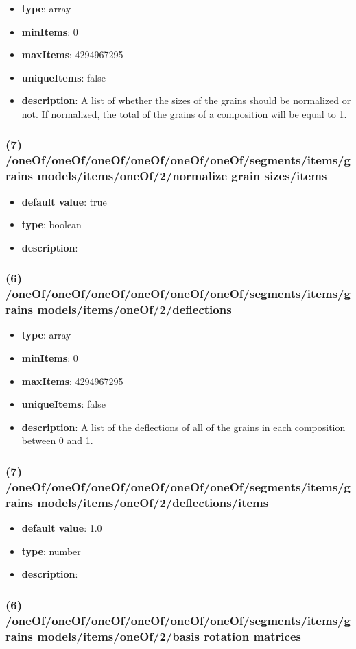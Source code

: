 \begin{itemize}[leftmargin=6em]\item {\bf type}: array
\item {\bf minItems}: 0
\item {\bf maxItems}: 4294967295
\item {\bf uniqueItems}: false
\item {\bf description}: A list of whether the sizes of the grains should be normalized or not. If normalized, the total of the grains of a composition will be equal to 1.
\end{itemize}\subsubsection{(7) /oneOf/oneOf/oneOf/oneOf/oneOf/oneOf/segments/items/grains models/items/oneOf/2/normalize grain sizes/items}
\begin{itemize}[leftmargin=7em]\item {\bf default value}: true
\item {\bf type}: boolean
\item {\bf description}: 
\end{itemize}\subsubsection{(6) /oneOf/oneOf/oneOf/oneOf/oneOf/oneOf/segments/items/grains models/items/oneOf/2/deflections}
\begin{itemize}[leftmargin=6em]\item {\bf type}: array
\item {\bf minItems}: 0
\item {\bf maxItems}: 4294967295
\item {\bf uniqueItems}: false
\item {\bf description}: A list of the deflections of all of the grains in each composition between 0 and 1.
\end{itemize}\subsubsection{(7) /oneOf/oneOf/oneOf/oneOf/oneOf/oneOf/segments/items/grains models/items/oneOf/2/deflections/items}
\begin{itemize}[leftmargin=7em]\item {\bf default value}: 1.0
\item {\bf type}: number
\item {\bf description}: 
\end{itemize}\subsubsection{(6) /oneOf/oneOf/oneOf/oneOf/oneOf/oneOf/segments/items/grains models/items/oneOf/2/basis rotation matrices}
